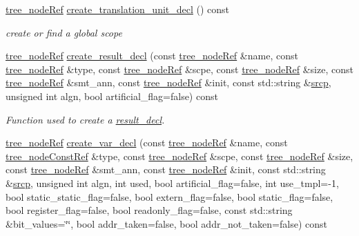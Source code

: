 \begin{DoxyCompactItemize}
\hyperlink{tree__node_8hpp_a6ee377554d1c4871ad66a337eaa67fd5}{tree\+\_\+node\+Ref} \hyperlink{classtree__manipulation_ae4e9b96f56a35d0d75db91cc8acd16ad}{create\+\_\+translation\+\_\+unit\+\_\+decl} () const
\begin{DoxyCompactList}\small\item\em create or find a global scope \end{DoxyCompactList}\item 
\hyperlink{tree__node_8hpp_a6ee377554d1c4871ad66a337eaa67fd5}{tree\+\_\+node\+Ref} \hyperlink{classtree__manipulation_a7e9adc5785c0b55a5720e70fd7967a35}{create\+\_\+result\+\_\+decl} (const \hyperlink{tree__node_8hpp_a6ee377554d1c4871ad66a337eaa67fd5}{tree\+\_\+node\+Ref} \&name, const \hyperlink{tree__node_8hpp_a6ee377554d1c4871ad66a337eaa67fd5}{tree\+\_\+node\+Ref} \&type, const \hyperlink{tree__node_8hpp_a6ee377554d1c4871ad66a337eaa67fd5}{tree\+\_\+node\+Ref} \&scpe, const \hyperlink{tree__node_8hpp_a6ee377554d1c4871ad66a337eaa67fd5}{tree\+\_\+node\+Ref} \&size, const \hyperlink{tree__node_8hpp_a6ee377554d1c4871ad66a337eaa67fd5}{tree\+\_\+node\+Ref} \&smt\+\_\+ann, const \hyperlink{tree__node_8hpp_a6ee377554d1c4871ad66a337eaa67fd5}{tree\+\_\+node\+Ref} \&init, const std\+::string \&\hyperlink{structsrcp}{srcp}, unsigned int algn, bool artificial\+\_\+flag=false) const
\begin{DoxyCompactList}\small\item\em Function used to create a \hyperlink{structresult__decl}{result\+\_\+decl}. \end{DoxyCompactList}\item 
\hyperlink{tree__node_8hpp_a6ee377554d1c4871ad66a337eaa67fd5}{tree\+\_\+node\+Ref} \hyperlink{classtree__manipulation_ada8044d7be8b0243bd32ae1dd213ce46}{create\+\_\+var\+\_\+decl} (const \hyperlink{tree__node_8hpp_a6ee377554d1c4871ad66a337eaa67fd5}{tree\+\_\+node\+Ref} \&name, const \hyperlink{tree__node_8hpp_a3cf5d02292c940f3892425a5b5fdec3c}{tree\+\_\+node\+Const\+Ref} \&type, const \hyperlink{tree__node_8hpp_a6ee377554d1c4871ad66a337eaa67fd5}{tree\+\_\+node\+Ref} \&scpe, const \hyperlink{tree__node_8hpp_a6ee377554d1c4871ad66a337eaa67fd5}{tree\+\_\+node\+Ref} \&size, const \hyperlink{tree__node_8hpp_a6ee377554d1c4871ad66a337eaa67fd5}{tree\+\_\+node\+Ref} \&smt\+\_\+ann, const \hyperlink{tree__node_8hpp_a6ee377554d1c4871ad66a337eaa67fd5}{tree\+\_\+node\+Ref} \&init, const std\+::string \&\hyperlink{structsrcp}{srcp}, unsigned int algn, int used, bool artificial\+\_\+flag=false, int use\+\_\+tmpl=-\/1, bool static\+\_\+static\+\_\+flag=false, bool extern\+\_\+flag=false, bool static\+\_\+flag=false, bool register\+\_\+flag=false, bool readonly\+\_\+flag=false, const std\+::string \&bit\+\_\+values=\char`\"{}\char`\"{}, bool addr\+\_\+taken=false, bool addr\+\_\+not\+\_\+taken=false) const

\end{DoxyCompactItemize}
